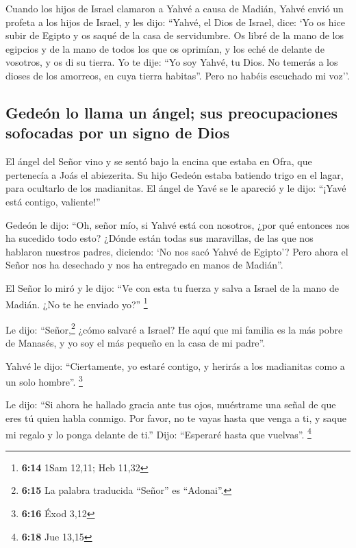  Cuando los hijos de Israel clamaron a Yahvé a causa de
Madián,  Yahvé envió un profeta a los hijos de Israel, y
les dijo: ``Yahvé, el Dios de Israel, dice: `Yo os hice subir de Egipto
y os saqué de la casa de servidumbre.  Os libré de la mano
de los egipcios y de la mano de todos los que os oprimían, y los eché de
delante de vosotros, y os di su tierra.  Yo te dije: ``Yo
soy Yahvé, tu Dios. No temerás a los dioses de los amorreos, en cuya
tierra habitas''. Pero no habéis escuchado mi voz''.

\hypertarget{gedeuxf3n-lo-llama-un-uxe1ngel-sus-preocupaciones-sofocadas-por-un-signo-de-dios}{%
\subsection{Gedeón lo llama un ángel; sus preocupaciones sofocadas por
un signo de
Dios}\label{gedeuxf3n-lo-llama-un-uxe1ngel-sus-preocupaciones-sofocadas-por-un-signo-de-dios}}

 El ángel del Señor vino y se sentó bajo la encina que
estaba en Ofra, que pertenecía a Joás el abiezerita. Su hijo Gedeón
estaba batiendo trigo en el lagar, para ocultarlo de los madianitas.
 El ángel de Yavé se le apareció y le dijo: ``¡Yavé está
contigo, valiente!''

 Gedeón le dijo: ``Oh, señor mío, si Yahvé está con
nosotros, ¿por qué entonces nos ha sucedido todo esto? ¿Dónde están
todas sus maravillas, de las que nos hablaron nuestros padres, diciendo:
`No nos sacó Yahvé de Egipto'? Pero ahora el Señor nos ha desechado y
nos ha entregado en manos de Madián''.

 El Señor lo miró y le dijo: ``Ve con esta tu fuerza y
salva a Israel de la mano de Madián. ¿No te he enviado yo?'' \footnote{\textbf{6:14}
  1Sam 12,11; Heb 11,32}

 Le dijo: ``Señor,\footnote{\textbf{6:15} La palabra
  traducida ``Señor'' es ``Adonai''.} ¿cómo salvaré a Israel? He aquí
que mi familia es la más pobre de Manasés, y yo soy el más pequeño en la
casa de mi padre''.

 Yahvé le dijo: ``Ciertamente, yo estaré contigo, y
herirás a los madianitas como a un solo hombre''. \footnote{\textbf{6:16}
  Éxod 3,12}

 Le dijo: ``Si ahora he hallado gracia ante tus ojos,
muéstrame una señal de que eres tú quien habla conmigo. 
Por favor, no te vayas hasta que venga a ti, y saque mi regalo y lo
ponga delante de ti.'' Dijo: ``Esperaré hasta que vuelvas''. \footnote{\textbf{6:18}
  Jue 13,15}

